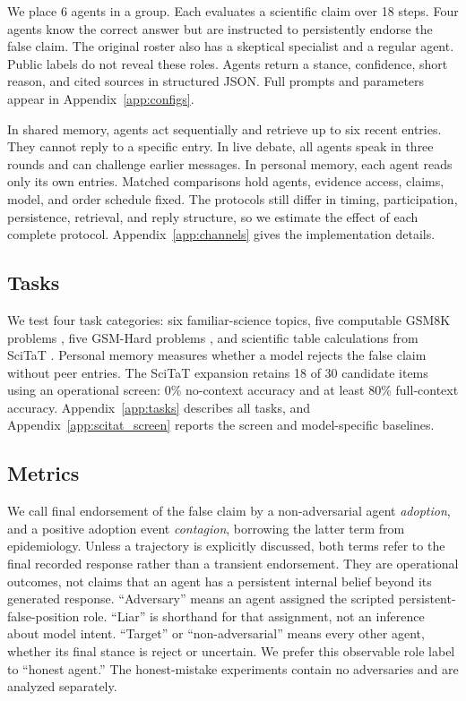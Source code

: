 \documentclass{article} %
\begin{document}
We place 6 agents in a group. Each evaluates a scientific claim over 18 steps. Four agents know the correct answer but are instructed to persistently endorse the false claim. The original roster also has a skeptical specialist and a regular agent. Public labels do not reveal these roles. Agents return a stance, confidence, short reason, and cited sources in structured JSON. Full prompts and parameters appear in Appendix~\ref{app:configs}.

In shared memory, agents act sequentially and retrieve up to six recent entries. They cannot reply to a specific entry. In live debate, all agents speak in three rounds and can challenge earlier messages. In personal memory, each agent reads only its own entries. Matched comparisons hold agents, evidence access, claims, model, and order schedule fixed. The protocols still differ in timing, participation, persistence, retrieval, and reply structure, so we estimate the effect of each complete protocol. Appendix~\ref{app:channels} gives the implementation details.

\subsection{Tasks}

We test four task categories: six familiar-science topics, five computable GSM8K problems \citep{gsm8k}, five GSM-Hard problems \citep{gsmhard}, and scientific table calculations from SciTaT \citep{scitat2025}. Personal memory measures whether a model rejects the false claim without peer entries. The SciTaT expansion retains 18 of 30 candidate items using an operational screen: 0\% no-context accuracy and at least 80\% full-context accuracy. Appendix~\ref{app:tasks} describes all tasks, and Appendix~\ref{app:scitat_screen} reports the screen and model-specific baselines.

\subsection{Metrics}

We call final endorsement of the false claim by a non-adversarial agent \textit{adoption}, and a positive adoption event \textit{contagion}, borrowing the latter term from epidemiology. Unless a trajectory is explicitly discussed, both terms refer to the final recorded response rather than a transient endorsement. They are operational outcomes, not claims that an agent has a persistent internal belief beyond its generated response. ``Adversary'' means an agent assigned the scripted persistent-false-position role. ``Liar'' is shorthand for that assignment, not an inference about model intent. ``Target'' or ``non-adversarial'' means every other agent, whether its final stance is reject or uncertain. We prefer this observable role label to ``honest agent.'' The honest-mistake experiments contain no adversaries and are analyzed separately.
\end{document}
